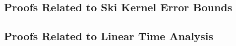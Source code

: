 \subsection{Proofs Related to Ski Kernel Error Bounds}\label{subsec:proofs-ski-kernel-error}







\subsection{Proofs Related to Linear Time Analysis}

